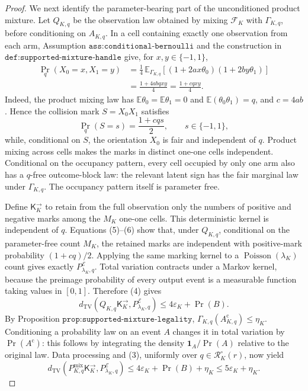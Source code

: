 \documentclass{article}
\begin{document}
\begin{proof}
We next identify the parameter-bearing part of the unconditioned product
mixture.  Let \(Q_{K,q}\) be the observation law obtained by mixing
\(\mathcal F_K\) with \(\Gamma_{K,q}\), before conditioning on
\(A_{K,q}\).  In a cell containing exactly one observation from each
arm, Assumption \(\texttt{ass:conditional-bernoulli}\) and the
construction in \(\texttt{def:supported-mixture-handle}\) give, for
\(x,y\in\{-1,1\}\),
\[
\begin{aligned}
 \Pr_q(X_0=x,X_1=y)
 &=\frac14\,
   \mathbb E_{\Gamma_{K,q}}
   \left[(1+2ax\theta_0)(1+2by\theta_1)\right]\\
 &=\frac{1+4abqxy}{4}
 =\frac{1+cqxy}{4}.
\end{aligned}
\tag{5}
\]
Indeed, the product mixing law has
\(\mathbb E\theta_0=\mathbb E\theta_1=0\) and
\(\mathbb E(\theta_0\theta_1)=q\), and \(c=4ab\).  Hence the collision
mark \(S=X_0X_1\) satisfies
\[
 \Pr_q(S=s)=\frac{1+cqs}{2},
 \qquad s\in\{-1,1\},
 \tag{6}
\]
while, conditional on \(S\), the orientation \(X_0\) is fair and
independent of \(q\).  Product mixing across cells makes the marks in
distinct one-one cells independent.  Conditional on the occupancy
pattern, every cell occupied by only one arm also has a \(q\)-free
outcome-block law: the relevant latent sign has the fair marginal law
under \(\Gamma_{K,q}\).  The occupancy pattern itself is parameter free.

Define \(\mathsf K_K^{\to}\) to retain from the full observation only the
numbers of positive and negative marks among the \(M_K\) one-one cells.
This deterministic kernel is independent of \(q\).  Equations (5)--(6)
show that, under \(Q_{K,q}\), conditional on the parameter-free count
\(M_K\), the retained marks are independent with positive-mark
probability \((1+cq)/2\).  Applying the same marking kernel to a
\(\operatorname{Poisson}(\lambda_K)\) count gives exactly
\(P^{\mathcal E}_{\lambda_K,q}\).  Total variation contracts under a
Markov kernel, because the preimage probability of every output event is
a measurable function taking values in \([0,1]\).  Therefore (4) gives
\[
 d_{\mathrm{TV}}\!\left(
 Q_{K,q}\mathsf K_K^{\to},P^{\mathcal E}_{\lambda_K,q}\right)
 \le 4\varepsilon_K+\Pr(B).
 \tag{7}
\]
By Proposition \(\texttt{prop:supported-mixture-legality}\),
\(\Gamma_{K,q}(A_{K,q}^{\mathrm c})\le\eta_K\).  Conditioning a
probability law on an event \(A\) changes it in total variation by
\(\Pr(A^{\mathrm c})\): this follows by integrating the density
\(\mathbf 1_A/\Pr(A)\) relative to the original law.  Data processing
and (3), uniformly over \(q\in\mathcal R_K^\circ(r)\), now yield
\[
 d_{\mathrm{TV}}\!\left(
 P^{\mathrm{mix}}_{K,q}\mathsf K_K^{\to},
 P^{\mathcal E}_{\lambda_K,q}\right)
 \le 4\varepsilon_K+\Pr(B)+\eta_K
 \le 5\varepsilon_K+\eta_K.
 \tag{8}
\]


\end{proof}
\end{document}
